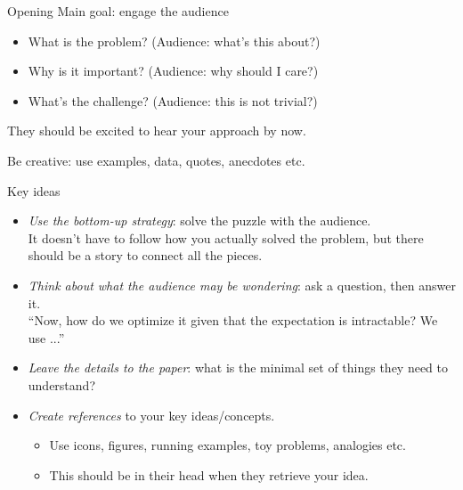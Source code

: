\documentclass[usenames,dvipsnames,notes]{beamer}
\begin{document}
\begin{frame}
    {Opening}
    Main goal: engage the audience\\
    \begin{itemize}
        \item What is the problem? (Audience: what's this about?)
        \item Why is it important? (Audience: why should I care?)
        \item What's the challenge? (Audience: this is not trivial?)
    \end{itemize}
    They should be excited to hear your approach by now.

    Be creative: use examples, data, quotes, anecdotes etc.
\end{frame}

\begin{frame}
    {Key ideas}
    \begin{itemize}
        \item \emph{Use the bottom-up strategy}: solve the puzzle with the audience. \\
                It doesn't have to follow how you actually solved the problem,
                but there should be a story to connect all the pieces.
            \item \emph{Think about what the audience may be wondering}: ask a question, then answer it. \\
            ``Now, how do we optimize it given that the expectation is intractable? We use ...''
        \item \emph{Leave the details to the paper}: what is the minimal set of things they need to understand?
        \item \emph{Create references} to your key ideas/concepts.
            \begin{itemize}
                \item Use icons, figures, running examples, toy problems, analogies etc.
                \item This should be in their head when they retrieve your idea.
            \end{itemize}
    \end{itemize}
\end{frame}
\end{document}
